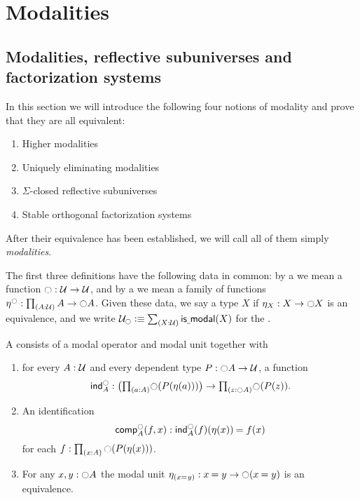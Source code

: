 \chapter{Modalities}\label{chap:modalities}

\section{Modalities, reflective subuniverses and factorization systems}\label{sec:modal-refl-subun}

In this section we will introduce the following four notions of modality
and prove that they are all equivalent:
\begin{enumerate}
\item Higher modalities
\item Uniquely eliminating modalities
\item $\Sigma$-closed reflective subuniverses
\item Stable orthogonal factorization systems
\end{enumerate}
After their equivalence has been established, we will call all of them simply \emph{modalities}.

The first three definitions have the following data in common: by a  we mean a function $\modal:\UU\to\UU$, and by a  we mean a family of functions $\modalunit^\modal:\prd*{A:\UU}A\to\modal A$.
Given these data, we say a type $X$  if $\modalunit[X]:X\to\modal X$ is an equivalence, and we write $\UU_\modal \defeq \sm{X:\UU} \ismodal(X)$ for the .

\begin{defn}\label{defn:highermod}
A  consists of a modal operator and modal unit together with
\begin{enumerate}
\item for every $A:\UU$ and every dependent type $P:\modal A\to\UU$, a
function
\begin{equation*}
\mathsf{ind}^\modal_A:\big(\prd{a:A}\modal(P(\eta(a)))\big)\to\prd{z:\modal A}\modal(P(z)).
\end{equation*}
\item An identification
\begin{equation*}
\mathsf{comp}^\modal_A(f,x):\id{\mathsf{ind}^\modal_A(f)(\eta(x))}{f(x)}
\end{equation*}
for each $f:\prd{x:A}\modal(P(\eta(x)))$.
\item For any $x,y:\modal A$ the modal unit $\modalunit[(\id{x}{y})]:\id{x}{y}\to \modal(\id{x}{y})$ is an equivalence.
\end{enumerate}
\end{defn}

